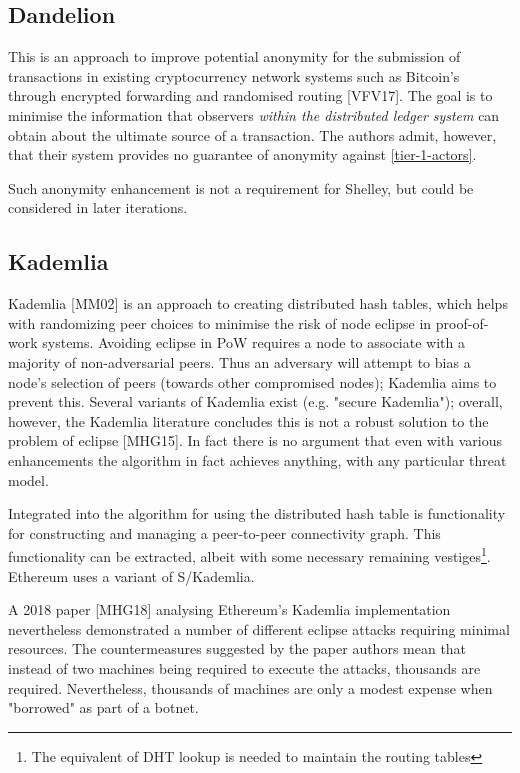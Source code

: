 \documentclass[11pt,a4paper]{article}
\begin{document}
\subsection{Dandelion}
\label{dandelion}

This is an approach to improve potential anonymity for the submission of
transactions in existing cryptocurrency network systems such as
Bitcoin's through encrypted forwarding and randomised routing
{[}VFV17{]}. The goal is to minimise the information that observers
\emph{within the distributed ledger} \emph{system} can obtain about the
ultimate source of a transaction. The authors admit, however, that their
system provides no guarantee of anonymity against
\cref{tier-1-actors}.

Such anonymity enhancement is not a requirement for Shelley, but could
be considered in later iterations.

\subsection{Kademlia}
\label{kademlia}

Kademlia {[}MM02{]} is an approach to creating distributed hash tables,
which helps with randomizing peer choices to minimise the risk of node
eclipse in proof-of-work systems. Avoiding eclipse in PoW requires a
node to associate with a majority of non-adversarial peers. Thus an
adversary will attempt to bias a node's selection of peers (towards
other compromised nodes); Kademlia aims to prevent this. Several
variants of Kademlia exist (e.g. "secure Kademlia"); overall, however,
the Kademlia literature concludes this is not a robust solution to the
problem of eclipse {[}MHG15{]}. In fact there is no argument that even
with various enhancements the algorithm in fact achieves anything, with
any particular threat model.

Integrated into the algorithm for using the distributed hash table is
functionality for constructing and managing a peer-to-peer connectivity
graph. This functionality can be extracted, albeit with some necessary
remaining vestiges\footnote{The equivalent of DHT lookup is needed to
  maintain the routing tables}. Ethereum uses a variant of S/Kademlia.

A 2018 paper {[}MHG18{]} analysing Ethereum's Kademlia implementation
nevertheless demonstrated a number of different eclipse attacks
requiring minimal resources. The countermeasures suggested by the paper
authors mean that instead of two machines being required to execute the
attacks, thousands are required. Nevertheless, thousands of machines are
only a modest expense when "borrowed" as part of a botnet.
\end{document}
